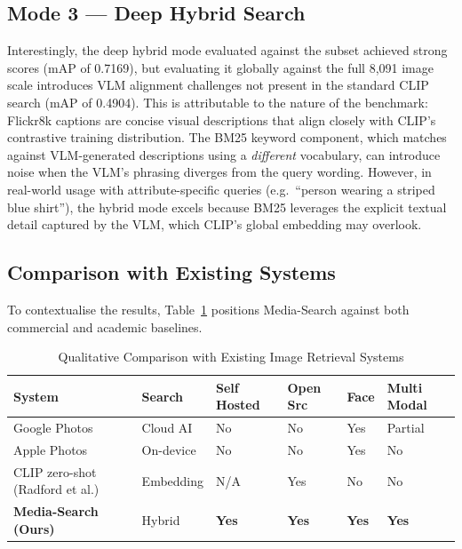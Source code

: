 \documentclass[12pt,a4paper,oneside]{report}
\begin{document}
\subsection{Mode 3 — Deep Hybrid Search}
Interestingly, the deep hybrid mode evaluated against the subset achieved strong scores (mAP of 0.7169), but evaluating it globally against the full 8,091 image scale introduces VLM alignment challenges not present in the standard CLIP search (mAP of 0.4904). This is attributable to the nature of the benchmark: Flickr8k
captions are concise visual descriptions that align closely with CLIP's
contrastive training distribution. The BM25 keyword component, which matches
against VLM-generated descriptions using a \emph{different} vocabulary, can
introduce noise when the VLM's phrasing diverges from the query wording.
However, in real-world usage with attribute-specific queries (e.g.\
``person wearing a striped blue shirt''), the hybrid mode excels because BM25
leverages the explicit textual detail captured by the VLM, which CLIP's
global embedding may overlook.

\subsection{Comparison with Existing Systems}

To contextualise the results, Table~\ref{tab:benchmark} positions
Media-Search against both commercial and academic baselines.

\begin{table}[H]
\centering\small
\caption{Qualitative Comparison with Existing Image Retrieval Systems}
\label{tab:benchmark}
\renewcommand{\arraystretch}{1.4}
\begin{tabular}{|p{2.6cm}|p{1.7cm}|p{1.3cm}|p{1.3cm}|p{1.3cm}|p{1.6cm}|}
\hline
\textbf{System} & \textbf{Search} & \textbf{Self Hosted} & \textbf{Open Src} & \textbf{Face} & \textbf{Multi Modal} \\
\hline
Google Photos & Cloud AI & No & No & Yes & Partial \\
\hline
Apple Photos & On-device & No & No & Yes & No \\
\hline
CLIP zero-shot (Radford et al.) & Embedding & N/A & Yes & No & No \\
\hline
\textbf{Media-Search (Ours)} & Hybrid & \textbf{Yes} & \textbf{Yes} & \textbf{Yes} & \textbf{Yes} \\
\hline
\end{tabular}
\end{table}
\end{document}
